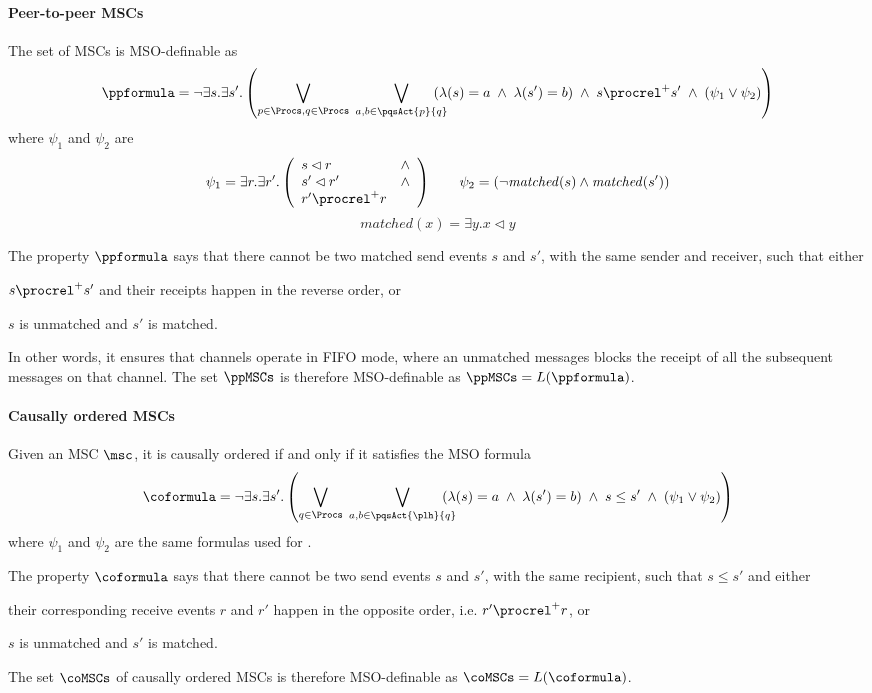 \paragraph*{Peer-to-peer MSCs}
	The set of \pp MSCs is MSO-definable as
	\[
		\ppformula = \neg \exists s.\exists s'. \left(
		\bigvee_{\substack{p \in \Procs, q \in \Procs}}\;
		\bigvee_{\substack{a,b \in \pqsAct{p}{q}}}\hspace{-1em}
		(\lambda(s) = a \;\wedge\; \lambda(s') = b) \;\wedge\; s \procrel^+ s' \;\wedge\;
		(\psi_1 \vee \psi_2 )
		\right)
	\]
	where $\psi_1$ and $\psi_2$ are
	\[
		\psi_1 = \exists r.\exists r'.\left(
		\begin{array}{ll}
			s \lhd r & \wedge\\
			s' \lhd r' & \wedge\\
			r' \procrel^+ r &
		\end{array}
		\right) \quad \quad
		\psi_2 = (\neg \mathit{matched}(s) \wedge \mathit{matched}(s'))
		\]
		\[
		matched(x) = \exists y. x \lhd y
	\]

The property $\ppformula$ says that there cannot be two matched send events $s$ and $s'$, with the same sender and receiver, such that either
\begin{enumerate*}[label={(\roman*)}]
	\item $s \procrel^+ s'$ and their receipts happen in the reverse order, or
	\item $s$ is unmatched and $s'$ is matched.
\end{enumerate*}
In other words, it ensures that channels operate in FIFO mode, where an unmatched messages blocks the receipt of all the subsequent messages on that channel.
The set $\ppMSCs$ is therefore MSO-definable as $\ppMSCs=L(\ppformula)$.

\paragraph*{Causally ordered MSCs}
Given an MSC $\msc$, it is causally ordered if and only if it satisfies the MSO formula
\[
	\coformula = \neg \exists s.\exists s'. \left(
	\bigvee_{\substack{q \in \Procs}}\;
	\bigvee_{\substack{a,b \in \pqsAct{\plh}{q}}}\hspace{-1em}
	(\lambda(s) = a \;\wedge\; \lambda(s') = b) \;\wedge\; s \le s' \;\wedge\;
	(\psi_1 \vee \psi_2 )
	\right)
\]
where $\psi_1$ and $\psi_2$ are the same formulas used for \pp.

The property $\coformula$ says that there cannot be two send events $s$ and $s'$, with the same recipient, such that $s \le s'$ and either
\begin{enumerate*}[label={(\roman*)}]
	\item their corresponding receive events $r$ and $r'$ happen in the opposite order, i.e. $r' \procrel^+ r$, or
	\item $s$ is unmatched and $s'$ is matched.
\end{enumerate*}
The set $\coMSCs$ of causally ordered MSCs is therefore MSO-definable as $\coMSCs=L(\coformula)$.

